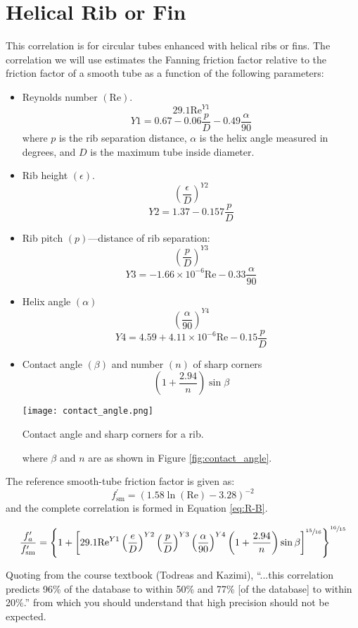 \section{Helical Rib or Fin}
This correlation is for circular tubes enhanced with helical ribs or fins.  The correlation\cite{ravigururajan1999comparative} we will use estimates the Fanning friction factor relative to the friction factor of a smooth tube as a function of the following parameters:
\begin{itemize}
\item Reynolds number $(\text{Re})$.
$$29.1\text{Re}^{Y1}$$
$$Y1 = 0.67-0.06\frac{p}{D}-0.49\frac{\alpha}{90}$$ 
where $p$ is the rib separation distance, $\alpha$ is the helix angle measured in degrees, and $D$ is the maximum tube inside diameter. 
\item Rib height $(\epsilon)$.
$$\left(\frac{\epsilon}{D} \right)^{Y2}$$
$$Y2 = 1.37 - 0.157 \frac{p}{D}$$
\item Rib pitch $(p)$---distance of rib separation:
$$\left(\frac{p}{D} \right)^{Y3}$$
$$Y3 = -1.66\times10^{-6}\text{Re}-0.33\frac{\alpha}{90}$$
\item Helix angle $(\alpha)$
$$\left(\frac{\alpha}{90} \right)^{Y4}$$
$$Y4 = 4.59+4.11\times10^{-6}\text{Re}-0.15\frac{p}{D}$$
\item Contact angle $(\beta)$ and number $(n)$ of sharp corners 
$$\left(1+\frac{2.94}{n} \right)\sin{\beta}$$
\begin{marginfigure}
\texttt{[image: contact\_angle.png]}
\caption{Contact angle and sharp corners for a rib.}
\label{fig:contact_angle}
\end{marginfigure}
where $\beta$ and $n$ are as shown in Figure \ref{fig:contact_angle}.

\end{itemize}
The reference smooth-tube friction factor is given as:
$$f^{\prime}_{\text{sm}}=\left(1.58\ln{(\text{Re})}-3.28 \right)^{-2}$$
and the complete correlation is formed in Equation \ref{eq:R-B}.

\begin{equation}
\frac{f^{\prime}_a}{f^{\prime}_{\text{sm}}} = \left\{1+\left[29.1\text{Re}^{Y1}\left(\frac{e}{D} \right)^{Y2}\left(\frac{p}{D}\right)^{Y3}\left( \frac{\alpha}{90}  \right)^{Y4} \left(1+\frac{2.94}{n} \right) \sin{\beta} \right]^{\sfrac{15}{16}} \right\}^{\sfrac{16}{15}}
\label{eq:R-B}
\end{equation}

Quoting from the course textbook (Todreas and Kazimi), ``...this correlation predicts 96\% of the database to within 50\% and 77\% [of the database] to within 20\%.'' from which you should understand that high precision should not be expected.

